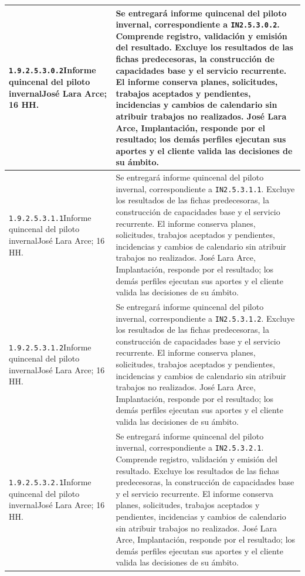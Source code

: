 \begin{longtable}{L{52mm}L{91mm}}
\texttt{1.\allowbreak{}9.\allowbreak{}2.\allowbreak{}5.\allowbreak{}3.\allowbreak{}0.\allowbreak{}2}\newline Informe quincenal del piloto invernal\newline José Lara Arce; 16 HH. & Se entregará informe quincenal del piloto invernal, correspondiente a \texttt{IN2.5.3.0.2}. Comprende registro, validación y emisión del resultado. Excluye los resultados de las fichas predecesoras, la construcción de capacidades base y el servicio recurrente.  El informe conserva planes, solicitudes, trabajos aceptados y pendientes, incidencias y cambios de calendario sin atribuir trabajos no realizados. José Lara Arce, Implantación, responde por el resultado; los demás perfiles ejecutan sus aportes y el cliente valida las decisiones de su ámbito.\\\hline
\texttt{1.\allowbreak{}9.\allowbreak{}2.\allowbreak{}5.\allowbreak{}3.\allowbreak{}1.\allowbreak{}1}\newline Informe quincenal del piloto invernal\newline José Lara Arce; 16 HH. & Se entregará informe quincenal del piloto invernal, correspondiente a \texttt{IN2.5.3.1.1}. Excluye los resultados de las fichas predecesoras, la construcción de capacidades base y el servicio recurrente.  El informe conserva planes, solicitudes, trabajos aceptados y pendientes, incidencias y cambios de calendario sin atribuir trabajos no realizados. José Lara Arce, Implantación, responde por el resultado; los demás perfiles ejecutan sus aportes y el cliente valida las decisiones de su ámbito.\\\hline
\texttt{1.\allowbreak{}9.\allowbreak{}2.\allowbreak{}5.\allowbreak{}3.\allowbreak{}1.\allowbreak{}2}\newline Informe quincenal del piloto invernal\newline José Lara Arce; 16 HH. & Se entregará informe quincenal del piloto invernal, correspondiente a \texttt{IN2.5.3.1.2}. Excluye los resultados de las fichas predecesoras, la construcción de capacidades base y el servicio recurrente.  El informe conserva planes, solicitudes, trabajos aceptados y pendientes, incidencias y cambios de calendario sin atribuir trabajos no realizados. José Lara Arce, Implantación, responde por el resultado; los demás perfiles ejecutan sus aportes y el cliente valida las decisiones de su ámbito.\\\hline
\texttt{1.\allowbreak{}9.\allowbreak{}2.\allowbreak{}5.\allowbreak{}3.\allowbreak{}2.\allowbreak{}1}\newline Informe quincenal del piloto invernal\newline José Lara Arce; 16 HH. & Se entregará informe quincenal del piloto invernal, correspondiente a \texttt{IN2.5.3.2.1}. Comprende registro, validación y emisión del resultado. Excluye los resultados de las fichas predecesoras, la construcción de capacidades base y el servicio recurrente.  El informe conserva planes, solicitudes, trabajos aceptados y pendientes, incidencias y cambios de calendario sin atribuir trabajos no realizados. José Lara Arce, Implantación, responde por el resultado; los demás perfiles ejecutan sus aportes y el cliente valida las decisiones de su ámbito.\\\hline

\end{longtable}
